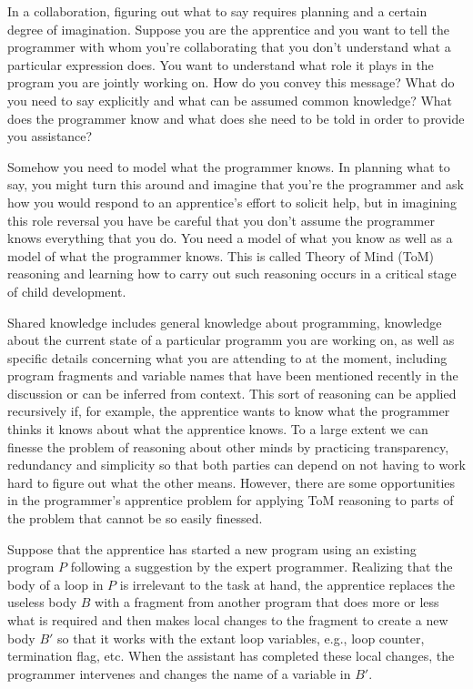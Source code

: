 
In a collaboration, figuring out what to say requires planning and a certain degree of imagination. Suppose you are the apprentice and you want to tell the programmer with whom you're collaborating that you don't understand what a particular expression does. You want to understand what role it plays in the program you are jointly working on. How do you convey this message? What do you need to say explicitly and what can be assumed common knowledge? What does the programmer know and what does she need to be told in order to provide you assistance?

Somehow you need to model what the programmer knows. In planning what to say, you might turn this around and imagine that you're the programmer and ask how you would respond to an apprentice's effort to solicit help, but in imagining this role reversal you have be careful that you don't assume the programmer knows everything that you do. You need a model of what you know as well as a model of what the programmer knows. This is called Theory of Mind (ToM) reasoning and learning how to carry out such reasoning occurs in a critical stage of child development.

Shared knowledge includes general knowledge about programming, knowledge about the current state of a particular programm you are working on, as well as specific details concerning what you are attending to at the moment, including program fragments and variable names that have been mentioned recently in the discussion or can be inferred from context. This sort of reasoning can be applied recursively if, for example, the apprentice wants to know what the programmer thinks it knows about what the apprentice knows. To a large extent we can finesse the problem of reasoning about other minds by practicing transparency, redundancy and simplicity so that both parties can depend on not having to work hard to figure out what the other means. However, there are some opportunities in the programmer's apprentice problem for applying ToM reasoning to parts of the problem that cannot be so easily finessed.

Suppose that the apprentice has started a new program using an existing program $P$ following a suggestion by the expert programmer. Realizing that the body of a loop in $P$ is irrelevant to the task at hand, the apprentice replaces the useless body $B$ with a fragment from another program that does more or less what is required and then makes local changes to the fragment to create a new body $B'$ so that it works with the extant loop variables, e.g., loop counter, termination flag, etc. When the assistant has completed these local changes, the programmer intervenes and changes the name of a variable in $B'$.

